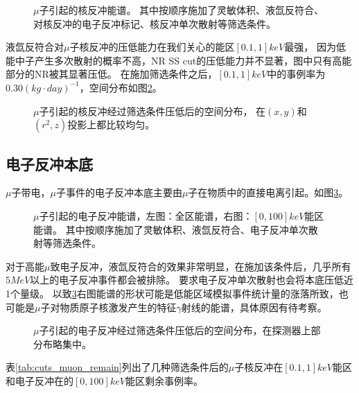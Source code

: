 \begin{figure}
  \centering
  
  \caption{\label{fig:muon_nr} $\mu$子引起的核反冲能谱。
  其中按顺序施加了灵敏体积、液氙反符合、对核反冲的电子反冲标记、核反冲单次散射等筛选条件。}
\end{figure}

液氙反符合对$\mu$子核反冲的压低能力在我们关心的能区$[0.1,1]\si{keV}$最强，
因为低能中子产生多次散射的概率不高，NR SS cut的压低能力并不显著，图中只有高能部分的NR被其显著压低。
在施加筛选条件之后，$[0.1,1]\si{keV}$中的事例率为$0.30\left(\si{kg}\cdot\si{day}\right)^{-1}$，空间分布如图\ref{fig:muon_nr_xyzr}。

\begin{figure}
  \centering
  
  \caption{\label{fig:muon_nr_xyzr} $\mu$子引起的核反冲经过筛选条件压低后的空间分布，
  在$(x,y)$和$(r^2,z)$投影上都比较均匀。}
\end{figure}

\subsection{电子反冲本底}

$\mu$子带电，$\mu$子事件的电子反冲本底主要由$\mu$子在物质中的直接电离引起。如图\ref{fig:muon_er}。

\begin{figure}
  \centering
  
  \caption{\label{fig:muon_er} $\mu$子引起的电子反冲能谱，左图：全区能谱，右图：$[0, 100]\si{keV}$能区能谱。
  其中按顺序施加了灵敏体积、液氙反符合、电子反冲单次散射等筛选条件。}
\end{figure}

对于高能$\mu$致电子反冲，液氙反符合的效果非常明显，在施加该条件后，几乎所有$5\si{MeV}$以上的电子反冲事件都会被排除。
要求电子反冲单次散射也会将本底压低近1个量级。
以致\ref{fig:muon_er}右图能谱的形状可能是低能区域模拟事件统计量的涨落所致，也可能是$\mu$子对物质原子核激发产生的特征$\gamma$射线的能谱，具体原因有待考察。

\begin{figure}
  \centering
  
  \caption{\label{fig:muon_er_xyzr} $\mu$子引起的电子反冲经过筛选条件压低后的空间分布，在探测器上部分布略集中。}
\end{figure}

表\ref{tab:cuts_muon_remain}列出了几种筛选条件后的$\mu$子核反冲在$[0.1,1]\si{keV}$能区和电子反冲在的$[0,100]\si{keV}$能区剩余事例率。

